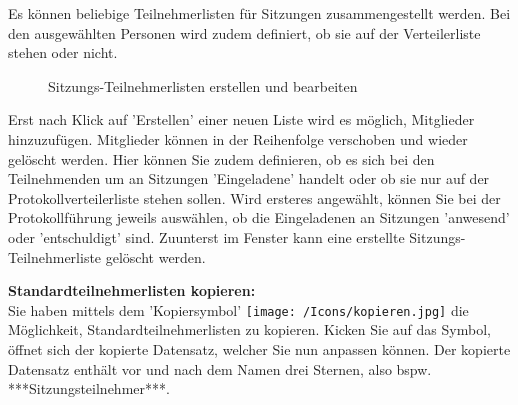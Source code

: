 Es können beliebige Teilnehmerlisten für Sitzungen zusammengestellt werden. Bei den ausgewählten Personen wird zudem definiert, ob sie auf der Verteilerliste stehen oder nicht.

\begin{figure}[H]
\end{figure}

\begin{figure}[H]
\vspace{-25pt}
\caption{Sitzungs-Teilnehmerlisten erstellen und bearbeiten}
\end{figure}

Erst nach Klick auf 'Erstellen' einer neuen Liste wird es möglich, Mitglieder hinzuzufügen. Mitglieder können in der Reihenfolge verschoben und wieder gelöscht werden. Hier können Sie zudem definieren, ob es sich bei den Teilnehmenden um an Sitzungen 'Eingeladene' handelt oder ob sie nur auf der Protokollverteilerliste stehen sollen. Wird ersteres angewählt, können Sie bei der Protokollführung jeweils auswählen, ob die Eingeladenen an Sitzungen 'anwesend' oder 'entschuldigt' sind. Zuunterst im Fenster kann eine erstellte Sitzungs-Teilnehmerliste gelöscht werden.

\vspace{\baselineskip}

\textbf{Standardteilnehmerlisten kopieren:}\\
Sie haben mittels dem 'Kopiersymbol' \texttt{[image: /Icons/kopieren.jpg]} die Möglichkeit, Standardteilnehmerlisten zu kopieren. Kicken Sie auf das Symbol, öffnet sich der kopierte Datensatz, welcher Sie nun anpassen können. Der kopierte Datensatz enthält vor und nach dem Namen drei Sternen, also bspw. ***Sitzungsteilnehmer***.

